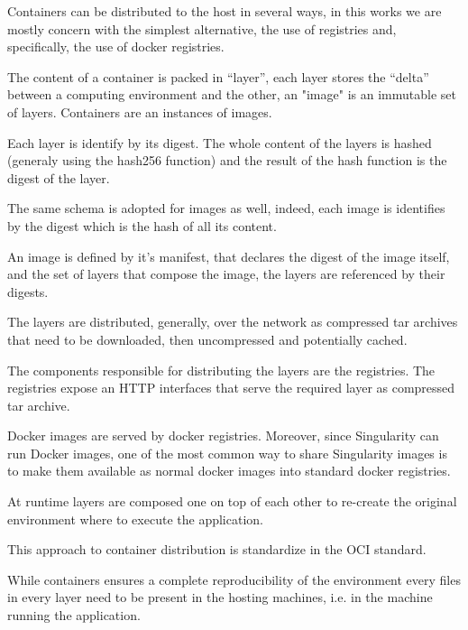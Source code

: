 Containers can be distributed to the host in several ways, in this works we are mostly concern with the simplest alternative, the use of registries and, specifically, the use of docker registries.

The content of a container is packed in “layer”, each layer stores the “delta” between a computing environment and the other, an "image" is an immutable set of layers. Containers are an instances of images.

Each layer is identify by its digest. The whole content of the layers is hashed (generaly using the hash256 function) and the result of the hash function is the digest of the layer.

The same schema is adopted for images as well, indeed, each image is identifies by the digest which is the hash of all its content.

An image is defined by it's manifest, that declares the digest of the image itself, and the set of layers that compose the image, the layers are referenced by their digests.

The layers are distributed, generally, over the network as compressed tar archives that need to be downloaded, then uncompressed and potentially cached.

The components responsible for distributing the layers are the registries. The registries expose an HTTP interfaces that serve the required layer as compressed tar archive.

Docker images are served by docker registries. Moreover, since Singularity can run Docker images, one of the most common way to share Singularity images is to make them available as normal docker images into standard docker registries. 

At runtime layers are composed one on top of each other to re-create the original environment where to execute the application.

This approach to container distribution is standardize in the OCI standard.

While containers ensures a complete reproducibility of the environment every files in every layer need to be present in the hosting machines, i.e. in the machine running the application.


